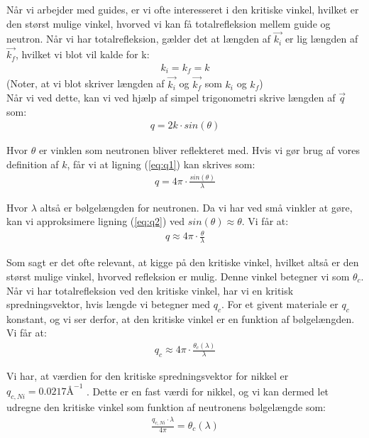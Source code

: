 \documentclass[12pt,oneside,a4paper]{article}
\begin{document}
{{{{{Når vi arbejder med guides, er vi ofte interesseret i den kritiske vinkel, hvilket er den størst mulige vinkel, hvorved vi kan få totalrefleksion mellem guide og neutron. Når vi har totalrefleksion, gælder det at længden af $\vec{k_i}$ er lig længden af $\vec{k_f}$, hvilket vi blot vil kalde for k:
\begin{align}
k_i=k_f=k
\end{align}
(Noter, at vi blot skriver længden af $\vec{k_i}$ og $\vec{k_f}$ som $k_i$ og $k_f$) \\
Når vi ved dette, kan vi ved hjælp af simpel trigonometri skrive længden af $\vec{q}$ som:
\begin{align} \label{eq:q1}
q=2k \cdot sin(\theta)
\end{align}

Hvor $\theta$ er vinklen som neutronen bliver reflekteret med. Hvis vi gør brug af vores definition af $k$, får vi at ligning (\ref{eq:q1}) kan skrives som:
\begin{align} \label{eq:q2}
q=4\pi \cdot \frac{sin(\theta)}{\lambda}
\end{align}

Hvor $\lambda$ altså er bølgelængden for neutronen. Da vi har ved små vinkler at gøre, kan vi approksimere ligning (\ref{eq:q2})  ved $sin(\theta)≈\theta$. Vi får at:
\begin{align}
q≈4\pi \cdot \frac{\theta}{\lambda}
\end{align}

Som sagt er det ofte relevant, at kigge på den kritiske vinkel, hvilket altså er den størst mulige vinkel, hvorved refleksion er mulig. Denne vinkel betegner vi som $\theta_c$. Når vi har totalrefleksion ved den kritiske vinkel, har vi en kritisk spredningsvektor, hvis længde vi betegner med $q_c$. For et givent materiale er $q_c$ konstant, og vi ser derfor, at den kritiske vinkel er en funktion af bølgelængden. Vi får at:
\begin{align}
q_c≈4\pi \cdot \frac{\theta_c(\lambda)}{\lambda}
\end{align}

Vi har, at værdien for den kritiske spredningsvektor for nikkel er $q_{c, Ni}=0.0217\text{Å} ^{-1}$ \cite{lefmann_arleth_kirkensgaard_lebech_thomsen}. Dette er en fast værdi for nikkel, og vi kan dermed let udregne den kritiske vinkel som funktion af neutronens bølgelængde som: 
\begin{align}
\frac{q_{c,Ni} \cdot \lambda}{4\pi}=\theta_c(\lambda)
\end{align}

}}}}}
\end{document}
